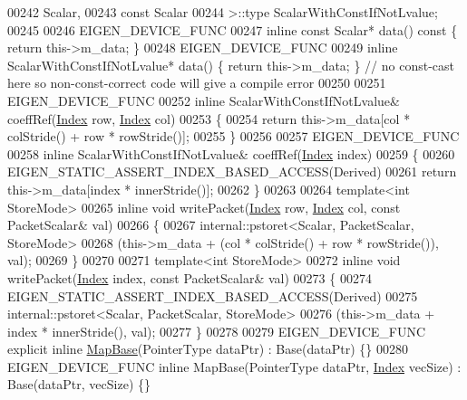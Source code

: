 \begin{DoxyCode}
00242                     Scalar,
00243                     \textcolor{keyword}{const} Scalar
00244                   >::type ScalarWithConstIfNotLvalue;
00245 
00246     EIGEN\_DEVICE\_FUNC
00247     \textcolor{keyword}{inline} \textcolor{keyword}{const} Scalar* data()\textcolor{keyword}{ const }\{ \textcolor{keywordflow}{return} this->m\_data; \}
00248     EIGEN\_DEVICE\_FUNC
00249     \textcolor{keyword}{inline} ScalarWithConstIfNotLvalue* data() \{ \textcolor{keywordflow}{return} this->m\_data; \} \textcolor{comment}{// no const-cast here so
       non-const-correct code will give a compile error}
00250 
00251     EIGEN\_DEVICE\_FUNC
00252     \textcolor{keyword}{inline} ScalarWithConstIfNotLvalue& coeffRef(\hyperlink{namespace_eigen_a62e77e0933482dafde8fe197d9a2cfde}{Index} row, \hyperlink{namespace_eigen_a62e77e0933482dafde8fe197d9a2cfde}{Index} col)
00253     \{
00254       \textcolor{keywordflow}{return} this->m\_data[col * colStride() + row * rowStride()];
00255     \}
00256 
00257     EIGEN\_DEVICE\_FUNC
00258     \textcolor{keyword}{inline} ScalarWithConstIfNotLvalue& coeffRef(\hyperlink{namespace_eigen_a62e77e0933482dafde8fe197d9a2cfde}{Index} index)
00259     \{
00260       EIGEN\_STATIC\_ASSERT\_INDEX\_BASED\_ACCESS(Derived)
00261       \textcolor{keywordflow}{return} this->m\_data[index * innerStride()];
00262     \}
00263 
00264     \textcolor{keyword}{template}<\textcolor{keywordtype}{int} StoreMode>
00265     \textcolor{keyword}{inline} \textcolor{keywordtype}{void} writePacket(\hyperlink{namespace_eigen_a62e77e0933482dafde8fe197d9a2cfde}{Index} row, \hyperlink{namespace_eigen_a62e77e0933482dafde8fe197d9a2cfde}{Index} col, \textcolor{keyword}{const} PacketScalar& val)
00266     \{
00267       internal::pstoret<Scalar, PacketScalar, StoreMode>
00268                (this->m\_data + (col * colStride() + row * rowStride()), val);
00269     \}
00270 
00271     \textcolor{keyword}{template}<\textcolor{keywordtype}{int} StoreMode>
00272     \textcolor{keyword}{inline} \textcolor{keywordtype}{void} writePacket(\hyperlink{namespace_eigen_a62e77e0933482dafde8fe197d9a2cfde}{Index} index, \textcolor{keyword}{const} PacketScalar& val)
00273     \{
00274       EIGEN\_STATIC\_ASSERT\_INDEX\_BASED\_ACCESS(Derived)
00275       internal::pstoret<Scalar, PacketScalar, StoreMode>
00276                 (this->m\_data + index * innerStride(), val);
00277     \}
00278 
00279     EIGEN\_DEVICE\_FUNC \textcolor{keyword}{explicit} \textcolor{keyword}{inline} \hyperlink{class_eigen_1_1_map_base}{MapBase}(PointerType dataPtr) : Base(dataPtr) \{\}
00280     EIGEN\_DEVICE\_FUNC \textcolor{keyword}{inline} MapBase(PointerType dataPtr, \hyperlink{namespace_eigen_a62e77e0933482dafde8fe197d9a2cfde}{Index} vecSize) : Base(dataPtr, vecSize) \{\}

\end{DoxyCode}
